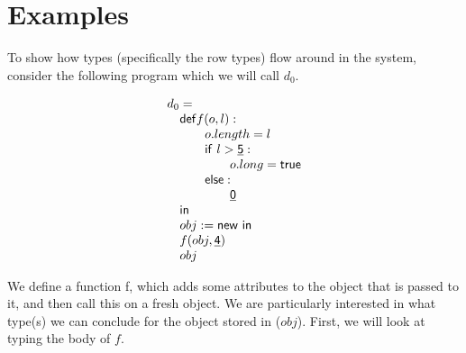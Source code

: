 \documentclass{acmart}
\begin{document}

\section{Examples}

To show how types (specifically the row types) flow around in the system,
consider the following program which we will call \(d_0\).

\[
  \begin{array}{l}
    d_0=\\
    \quad\mathsf{def} f(o,l):\\
    \quad\quad\quad o.length = l\\
    \quad\quad\quad \mathsf{if} \,\, l > \underline{\mathsf{5}} :\\
    \quad\quad\quad\quad\quad o.long = \mathsf{true} \\
    \quad\quad\quad \mathsf{else}:\\
    \quad\quad\quad\quad\quad \underline{\mathsf{0}}\\
    \quad\mathsf{in} \\
    \quad obj := \mathsf{new} \,\,\mathsf{in}\\
    \quad f(obj, \underline{\mathsf{4}}) \\
    \quad obj
  \end{array}
\]

We define a function f, which adds some attributes to the object that is passed
to it, and then call this on a fresh object. We are particularly interested
in what type(s) we can conclude for the object stored in (\(obj\)). First, we
will look at typing the body of \(f\).
\end{document}
